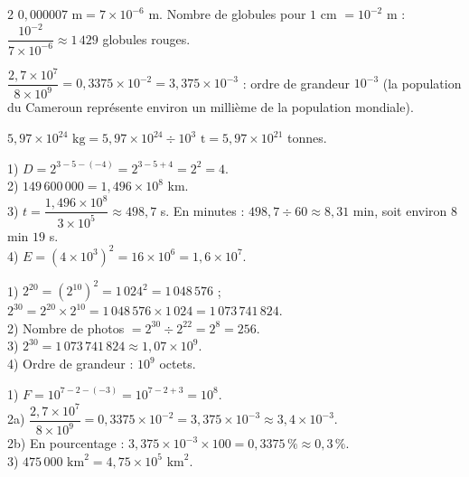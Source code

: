 \begin{multicols}{2}
$0{,}000007\text{ m}=7\times10^{-6}$ m. Nombre de globules pour $1$ cm $=10^{-2}$ m :
$\dfrac{10^{-2}}{7\times10^{-6}}\approx1\,429$ globules rouges.

$\dfrac{2{,}7\times10^{7}}{8\times10^{9}}=0{,}3375\times10^{-2}=3{,}375\times10^{-3}$ :
ordre de grandeur $10^{-3}$ (la population du Cameroun représente environ un millième de la
population mondiale).

$5{,}97\times10^{24}\text{ kg}=5{,}97\times10^{24}\div10^{3}\text{ t}=5{,}97\times10^{21}$
tonnes.

1) $D=2^{3-5-(-4)}=2^{3-5+4}=2^{2}=4$.\\
2) $149\,600\,000=1{,}496\times10^{8}$ km.\\
3) $t=\dfrac{1{,}496\times10^{8}}{3\times10^{5}}\approx498{,}7$ s. En minutes :
$498{,}7\div60\approx8{,}31$ min, soit environ $8$ min $19$ s.\\
4) $E=\left(4\times10^{3}\right)^{2}=16\times10^{6}=1{,}6\times10^{7}$.

1) $2^{20}=\left(2^{10}\right)^{2}=1\,024^{2}=1\,048\,576$ ;\
$2^{30}=2^{20}\times2^{10}=1\,048\,576\times1\,024=1\,073\,741\,824$.\\
2) Nombre de photos $=2^{30}\div2^{22}=2^{8}=256$.\\
3) $2^{30}=1\,073\,741\,824\approx1{,}07\times10^{9}$.\\
4) Ordre de grandeur : $10^{9}$ octets.

1) $F=10^{7-2-(-3)}=10^{7-2+3}=10^{8}$.\\
2a) $\dfrac{2{,}7\times10^{7}}{8\times10^{9}}=0{,}3375\times10^{-2}=3{,}375\times10^{-3}\approx3{,}4\times10^{-3}$.\\
2b) En pourcentage : $3{,}375\times10^{-3}\times100=0{,}3375\,\%\approx0{,}3\,\%$.\\
3) $475\,000\text{ km}^{2}=4{,}75\times10^{5}\text{ km}^{2}$.

\end{multicols}
\exercicesBanner
